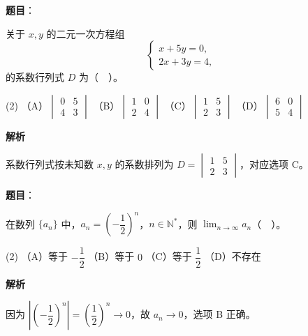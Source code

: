 \begin{answer}

\textbf{题目}：

关于 $x,y$ 的二元一次方程组
\nopagebreak[4]
\[
\begin{cases}
x+5y=0,\\
2x+3y=4,
\end{cases}
\]
的系数行列式 $D$ 为（　）。

\begin{gkopts}(2)
\task （A）$\begin{vmatrix}0&5\\4&3\end{vmatrix}$
\task （B）$\begin{vmatrix}1&0\\2&4\end{vmatrix}$
\task （C）$\begin{vmatrix}1&5\\2&3\end{vmatrix}$
\task （D）$\begin{vmatrix}6&0\\5&4\end{vmatrix}$
\end{gkopts}

\textbf{解析}

系数行列式按未知数 $x,y$ 的系数排列为 $D=\begin{vmatrix}1&5\\2&3\end{vmatrix}$，对应选项 C。


\end{answer}
\begin{answer}

\textbf{题目}：

在数列 $\{a_n\}$ 中，$a_n=\left(-\dfrac12\right)^n$，$n\in\mathbb N^*$，则 $\displaystyle\lim_{n\to\infty}a_n$（　）。

\begin{gkopts}(2)
\task （A）等于 $-\dfrac12$
\task （B）等于 $0$
\task （C）等于 $\dfrac12$
\task （D）不存在
\end{gkopts}

\textbf{解析}

因为 $\left|(-\dfrac12)^n\right|=(\dfrac12)^n\to0$，故 $a_n\to0$，选项 B 正确。


\end{answer}
